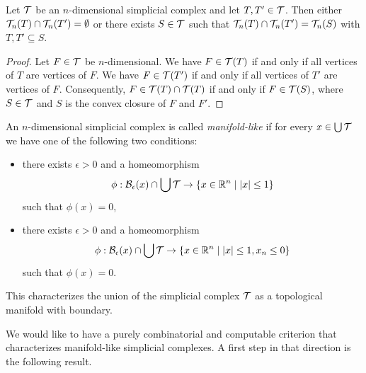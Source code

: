 \documentclass[a4paper]{article}
\begin{document}
\begin{lemma}
 Let ${\mathcal T}$ be an $n$-dimensional simplicial complex and let $T,T' \in {\mathcal T}$.
 Then either ${\mathcal T}_{n}(T) \cap {\mathcal T}_{n}(T') = \emptyset$ or there exists $S \in {\mathcal T}$
 such that ${\mathcal T}_{n}(T) \cap {\mathcal T}_{n}(T') = {\mathcal T}_{n}(S)$ with $T, T' \subseteq S$.
\end{lemma}
\begin{proof}
 Let $F \in {\mathcal T}$ be $n$-dimensional.
 We have $F \in {\mathcal T}(T )$ if and only if all vertices of $T $ are vertices of $F$.
 We have $F \in {\mathcal T}(T')$ if and only if all vertices of $T'$ are vertices of $F$.
 Consequently, $F \in {\mathcal T}(T) \cap {\mathcal T}(T)$ if and only if $F \in {\mathcal T}(S)$,
 where $S \in {\mathcal T}$ and $S$ is the convex closure of $F$ and $F'$.
\end{proof}


An $n$-dimensional simplicial complex is called \emph{manifold-like} if for every $x \in \bigcup {\mathcal T}$
we have one of the following two conditions:
\begin{itemize}
 \item 
 there exists $\epsilon > 0$ 
 and a homeomorphism 
 \begin{align*}
    \phi : \Ball_\epsilon(x) \cap \bigcup\calT  
    \rightarrow 
    \left\{ x \in \bbR^{n} \suchthat |x| \leq 1 \right\}
 \end{align*}
 such that $\phi(x) = 0$,
 \item 
 there exists $\epsilon > 0$ and a homeomorphism 
 \begin{align*}
    \phi : \Ball_\epsilon(x) \cap \bigcup\calT 
    \rightarrow 
    \left\{ x \in \bbR^{n} \suchthat |x| \leq 1, x_n \leq 0 \right\}
 \end{align*}
 such that $\phi(x) = 0$.
\end{itemize}
This characterizes the union of the simplicial complex ${\mathcal T}$ as a topological manifold with boundary. 

We would like to have a purely combinatorial and computable criterion that characterizes manifold-like simplicial complexes. A first step in that direction is the following result.
\end{document}
